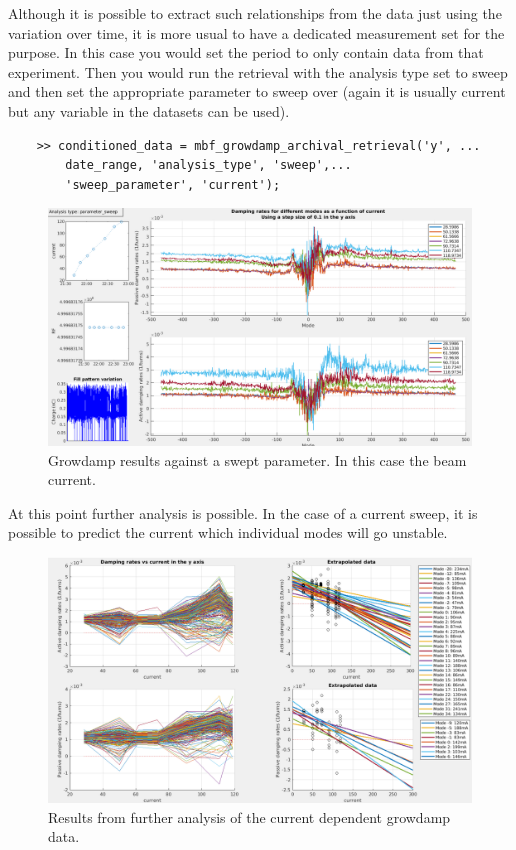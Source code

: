 \documentclass{report}
\begin{document}
Although it is possible to extract such relationships from the data just using the variation over time, it is more usual to have a dedicated measurement set for the purpose. In this case you would set the period to only contain data from that experiment. Then you would run the retrieval with the analysis type set to sweep and then set the appropriate parameter to sweep over (again it is usually current but any variable in the datasets can be used). 
\begin{verbatim}
    >> conditioned_data = mbf_growdamp_archival_retrieval('y', ...
        date_range, 'analysis_type', 'sweep',...
        'sweep_parameter', 'current'); 
\end{verbatim}
\begin{figure}[h]
    \centering
    \includegraphics[width=1\linewidth]{growdamp_parameter_sweep.png}
    \caption{Growdamp results against a swept parameter. In this case the beam current.}
    \label{fig:growdamp_parameter_sweep}
\end{figure}
At this point further analysis is possible. In the case of a current sweep, it is possible to predict the current which individual modes will go unstable. 
\begin{figure}[h]
    \centering
    \includegraphics[width=1\linewidth]{growdamp_parameter_sweep_further_analysis.png}
    \caption{Results from further analysis of the current dependent growdamp data.}
    \label{fig:growdamp_parameter_sweep_further_analysis}
\end{figure}
\end{document}
